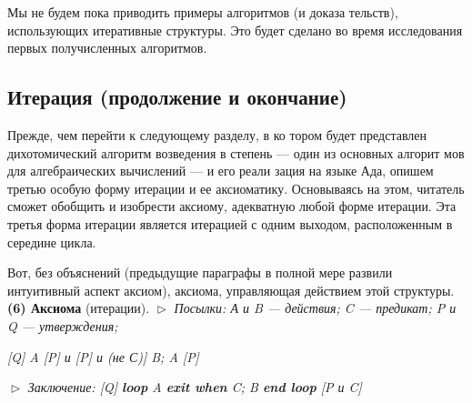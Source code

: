 \parindent=1cm Мы  не  будем  пока  приводить  примеры  алгоритмов   (и  доказа­
тельств),  использующих  итеративные  структуры.  Это  будет  сделано 
во время исследования первых получисленных алгоритмов.
\subsection{Итерация (продолжение и окончание)}
							\noindent Прежде,  чем  перейти  к  следующему  разделу,  в  ко­
							тором будет представлен дихотомический алгоритм 
							возведения в степень — один  из  основных алгорит­
							мов для алгебраических вычислений — и его реали­
							зация  на языке Ада, опишем третью особую форму 
							итерации и ее аксиоматику.  Основываясь на  этом,
читатель  сможет  обобщить  и  изобрести  аксиому,  адекватную  любой 
форме  итерации.  Эта  третья  форма  итерации  является  итерацией  с 
одним выходом, расположенным в середине цикла.

\parindent=1cm Вот, без объяснений (предыдущие параграфы в полной мере развили 
интуитивный  аспект  аксиом),  аксиома,  управляющая  действием  этой 
структуры.
\newline
\textbf{(6) Аксиома} (итерации).
\newline
$\vartriangleright$ \textit{Посылки: А и B --- действия; C --- предикат; P и Q --- утверждения;}
\begin{center}
\textit{[Q] A [P] и [P] и (не С)] B; A [P]}
\end{center}
$\vartriangleright$ \textit{Заключение:  \textit{[Q]} \textbf{loop} \textit{A} \textbf{exit when} \textit{C}; \textit{B} \textbf{end loop} \textit{[P и C]}}

